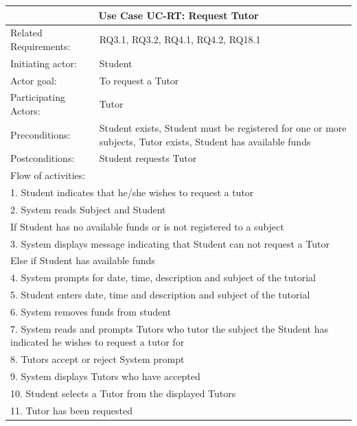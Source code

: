 \documentclass[12pt]{article}
\begin{document}
\begin{tabular}{| l | p{10cm}| }
			\hline\multicolumn{2}{|c|}{ \textbf{Use Case UC-RT: Request Tutor}} \\ \hline
			Related Requirements: & RQ3.1, RQ3.2, RQ4.1, RQ4.2, RQ18.1\\ \hline
			Initiating actor: & Student\\ \hline
			Actor goal: & To request a Tutor\\ \hline
			Participating Actors: & Tutor\\ \hline
			Preconditions: & Student exists, Student must be registered for one or more subjects, Tutor exists, Student has available funds\\ \hline
			Postconditions: & Student requests Tutor\\ \hline
			\multicolumn{2}{|l|}{Flow of activities:}\\ \hline
			\multicolumn{2}{|p{15cm}|}{1. Student indicates that he/she wishes to request a tutor}\\
			\multicolumn{2}{|p{15cm}|}{2. System reads Subject and Student}\\
			\multicolumn{2}{|p{15cm}|}{If Student has no available funds or is not registered to a subject}\\
			\multicolumn{2}{|p{15cm}|}{3. System displays message indicating that Student can not request a Tutor}\\
			\multicolumn{2}{|p{15cm}|}{Else if Student has available funds }	\\
			\multicolumn{2}{|l|}{4. System prompts for date, time, description and subject of the tutorial}\\
			\multicolumn{2}{|l|}{5. Student enters date, time and description and subject of the tutorial}\\
      \multicolumn{2}{|l|}{6. System removes funds from student}\\
			\multicolumn{2}{|p{15cm}|}{7. System reads and prompts Tutors who tutor the subject the Student has indicated he wishes to request a tutor for}\\
			\multicolumn{2}{|l|}{8. Tutors accept or reject System prompt}\\
			\multicolumn{2}{|l|}{9. System displays Tutors who have accepted}\\
			\multicolumn{2}{|l|}{10. Student selects a Tutor from the displayed Tutors}\\
			\multicolumn{2}{|l|}{11. Tutor has been requested}
			\\ \hline
		\end{tabular}
\end{document}

